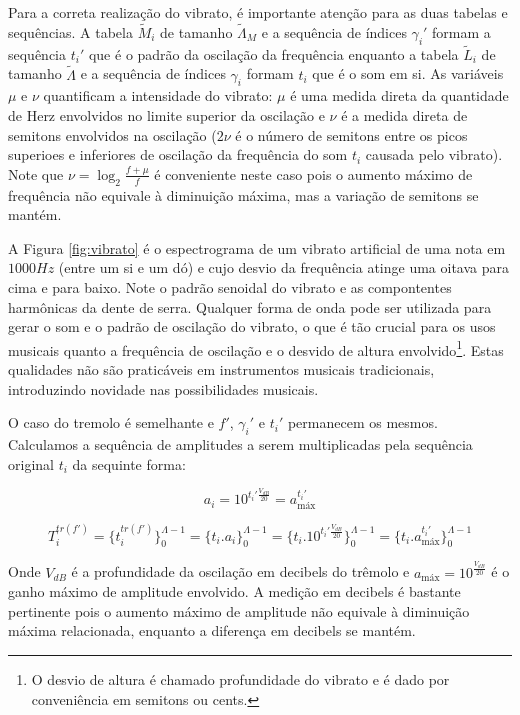 Para a correta realização do vibrato, é importante atenção para as duas tabelas e sequências.
A tabela $\widetilde{M}_i$ de tamanho $\widetilde{\Lambda}_M$ e a sequência de índices $\gamma_i'$ formam a sequência $t_i'$
 que é o padrão da oscilação da frequência enquanto
a tabela $\widetilde{L}_i$ de tamanho $\widetilde{\Lambda}$ e a sequência de índices $\gamma_i$ formam $t_i$ que é o som em si.
As variáveis $\mu$ e $\nu$ quantificam a intensidade do vibrato: $\mu$ é uma medida direta da quantidade
de Herz envolvidos no limite superior da oscilação e $\nu$ é a medida direta de semitons envolvidos na oscilação ($2\nu$ é o número de semitons entre os picos superioes e inferiores de oscilação da frequência do som $t_i$ causada pelo vibrato).
Note que $\nu=\log_{2}\frac{f+\mu}{f} $ é conveniente neste caso pois o aumento máximo de frequência
não equivale à diminuição máxima, mas a variação de semitons se mantém.

A Figura \ref{fig:vibrato} é o espectrograma de um vibrato artificial de uma nota em
$1000Hz$ (entre um si e um dó) e cujo desvio da frequência atinge uma oitava
para cima e para baixo. Note o padrão senoidal do vibrato e as compontentes harmônicas
da dente de serra. Qualquer forma de onda pode
ser utilizada para gerar o som e o padrão de oscilação do vibrato, o que é tão crucial para os usos musicais quanto a
frequência de oscilação e o desvido de altura envolvido\footnote{O desvio de altura
é chamado profundidade do vibrato e é dado por conveniência em semitons ou cents.}. Estas qualidades não são praticáveis em instrumentos musicais tradicionais, introduzindo novidade nas possibilidades musicais.

O caso do tremolo é semelhante e $f'$, $\gamma_i'$ e $t_i'$ permanecem os mesmos. Calculamos
a sequência de amplitudes a serem multiplicadas pela sequência original $t_i$ da
sequinte forma:

\begin{equation}\label{trA}
a_i=10^{t_i' \frac{V_{dB}}{20}} = a_{\text{máx}}^{t_i'}
\end{equation}

\begin{equation}\label{trT}
T_i^{tr(f')}=\{ t_i^{tr(f')} \}_0^{\Lambda-1}=\{ t_i . a_i \}_0^{\Lambda-1}=\{t_i .10^{t_i' \frac{V_{dB}}{20}}    \}_0^{\Lambda-1}=\{t_i . a_{\text{máx}}^{t_i'}\}_0^{\Lambda-1}
\end{equation}

Onde $V_{dB}$ é a profundidade da oscilação em decibels do trêmolo e $a_{\text{máx}}=10^{\frac{V_{dB}}{20}}$
 é o ganho máximo de amplitude envolvido.
A medição em decibels é bastante pertinente pois o aumento máximo de amplitude
não equivale à diminuição máxima relacionada, enquanto a diferença em decibels se mantém.

